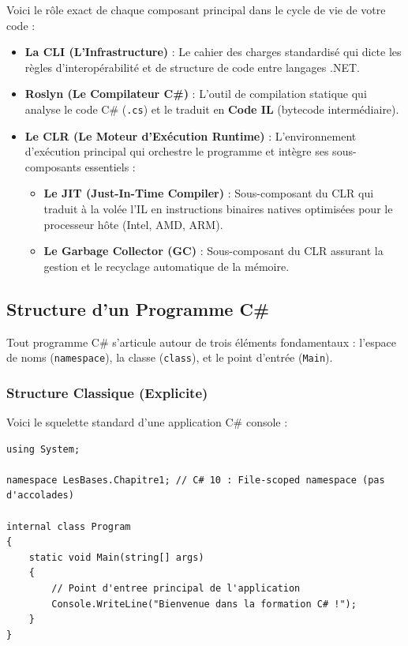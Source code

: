 Voici le rôle exact de chaque composant principal dans le cycle de vie de votre code :

\begin{itemize}
    \item \textbf{La CLI (L'Infrastructure)} : Le cahier des charges standardisé qui dicte les règles d'interopérabilité et de structure de code entre langages .NET.
    \item \textbf{Roslyn (Le Compilateur C\#)} : L'outil de compilation statique qui analyse le code C\# (\texttt{.cs}) et le traduit en \textbf{Code IL} (bytecode intermédiaire).
    \item \textbf{Le CLR (Le Moteur d'Exécution Runtime)} : L'environnement d'exécution principal qui orchestre le programme et intègre ses sous-composants essentiels :
    \begin{itemize}
        \item \textbf{Le JIT (Just-In-Time Compiler)} : Sous-composant du CLR qui traduit à la volée l'IL en instructions binaires natives optimisées pour le processeur hôte (Intel, AMD, ARM).
        \item \textbf{Le Garbage Collector (GC)} : Sous-composant du CLR assurant la gestion et le recyclage automatique de la mémoire.
    \end{itemize}
\end{itemize}

\subsection{Structure d'un Programme C\#}

Tout programme C\# s'articule autour de trois éléments fondamentaux : l'espace de noms (\texttt{namespace}), la classe (\texttt{class}), et le point d'entrée (\texttt{Main}).

\subsubsection{Structure Classique (Explicite)}

Voici le squelette standard d'une application C\# console :

\begin{lstlisting}[caption={Structure classique d'un fichier C\# (Program.cs)}]
using System;

namespace LesBases.Chapitre1; // C# 10 : File-scoped namespace (pas d'accolades)

internal class Program
{
    static void Main(string[] args)
    {
        // Point d'entree principal de l'application
        Console.WriteLine("Bienvenue dans la formation C# !");
    }
}
\end{lstlisting}


